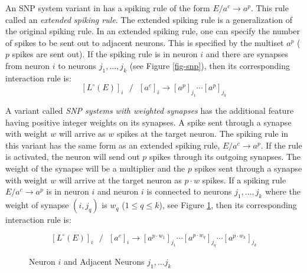 \documentclass[a4paper]{article}
\theoremstyle{definition}
\newcommand{\ra}{\rightarrow}
\newcommand{\ts}{\text{ }}
\begin{document}
An SNP system variant in \cite{chen-2008-snp-e} has a spiking rule of the form $E/a^c \ra a^p$. This 
rule called an \emph{extended spiking rule}. The extended spiking rule is a generalization of the 
original spiking rule. In an extended spiking rule, one can specify the number of spikes to be sent
out to adjacent neurons. This is specified by the multiset $a^p$ ($p$ spikes are sent out). If the
spiking rule is in neuron $i$ and there are synapses from neuron $i$ to neurons $j_1,...,j_k$ (see
Figure \ref{fig-snp}), then its corresponding interaction rule is: 
$${[L^{\circ}(E)]}_i\ts/\ts {[a^c]}_i \ra {[a^p]}_{j_1} \cdots {[a^p]}_{j_k}$$


A variant called \emph{SNP systems with weighted synapses} \cite{pan-2012-weighted-synapses} has the
additional feature having positive integer weights on its synapses. A spike sent through a synapse 
with weight $w$ will arrive as $w$ spikes at the target neuron. The spiking rule in this variant 
has the same form as an extended spiking rule, $E/a^c \ra a^p$. If the rule is activated, the neuron
will send out $p$ spikes through its outgoing synapses. The weight of the synapse will be a
multiplier and the $p$ spikes sent through a synapse with weight $w$ will arrive at the target 
neuron as $p\cdot w$ spikes. If a spiking rule $E/a^c \ra a^p$ is in neuron $i$ and neuron $i$ is 
connected to neurons $j_1,...,j_k$ where the weight of synapse $(i,j_q)$ is $w_q$ ($1 \leq q \leq 
k$), see Figure \ref{fig-snp2}, then its corresponding interaction rule is:

$${[L^{\circ}(E)]}_i\ts/\ts {[a^c]}_i \ra {[a^{p \cdot w_{1}}]}_{j_1} \cdots 
{[a^{p\cdot w_{q}}]}_{j_q} \cdots {[a^{p\cdot w_{k}}]}_{j_k}$$

\begin{figure}[H]
\begin{center}                                                                                           
\end{center}                                                                                             
\caption{Neuron $i$ and Adjacent Neurons $j_1,...j_k$}\label{fig-snp2}
\end{figure} 
\end{document}
